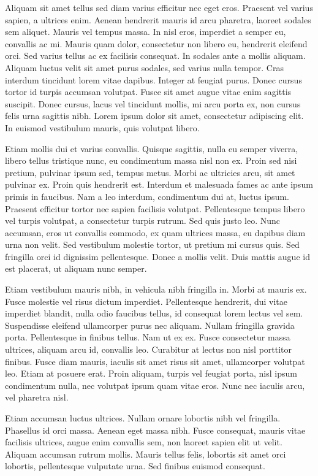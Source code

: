 Aliquam sit amet tellus sed diam varius efficitur nec eget eros. Praesent vel varius sapien, a ultrices enim. Aenean hendrerit mauris id arcu pharetra, laoreet sodales sem aliquet. Mauris vel tempus massa. In nisl eros, imperdiet a semper eu, convallis ac mi. Mauris quam dolor, consectetur non libero eu, hendrerit eleifend orci. Sed varius tellus ac ex facilisis consequat. In sodales ante a mollis aliquam. Aliquam luctus velit sit amet purus sodales, sed varius nulla tempor. Cras interdum tincidunt lorem vitae dapibus. Integer at feugiat purus. Donec cursus tortor id turpis accumsan volutpat. Fusce sit amet augue vitae enim sagittis suscipit. Donec cursus, lacus vel tincidunt mollis, mi arcu porta ex, non cursus felis urna sagittis nibh. Lorem ipsum dolor sit amet, consectetur adipiscing elit. In euismod vestibulum mauris, quis volutpat libero.

Etiam mollis dui et varius convallis. Quisque sagittis, nulla eu semper viverra, libero tellus tristique nunc, eu condimentum massa nisl non ex. Proin sed nisi pretium, pulvinar ipsum sed, tempus metus. Morbi ac ultricies arcu, sit amet pulvinar ex. Proin quis hendrerit est. Interdum et malesuada fames ac ante ipsum primis in faucibus. Nam a leo interdum, condimentum dui at, luctus ipsum. Praesent efficitur tortor nec sapien facilisis volutpat. Pellentesque tempus libero vel turpis volutpat, a consectetur turpis rutrum. Sed quis justo leo. Nunc accumsan, eros ut convallis commodo, ex quam ultrices massa, eu dapibus diam urna non velit. Sed vestibulum molestie tortor, ut pretium mi cursus quis. Sed fringilla orci id dignissim pellentesque. Donec a mollis velit. Duis mattis augue id est placerat, ut aliquam nunc semper.

Etiam vestibulum mauris nibh, in vehicula nibh fringilla in. Morbi at mauris ex. Fusce molestie vel risus dictum imperdiet. Pellentesque hendrerit, dui vitae imperdiet blandit, nulla odio faucibus tellus, id consequat lorem lectus vel sem. Suspendisse eleifend ullamcorper purus nec aliquam. Nullam fringilla gravida porta. Pellentesque in finibus tellus. Nam ut ex ex. Fusce consectetur massa ultrices, aliquam arcu id, convallis leo. Curabitur at lectus non nisl porttitor finibus. Fusce diam mauris, iaculis sit amet risus sit amet, ullamcorper volutpat leo. Etiam at posuere erat. Proin aliquam, turpis vel feugiat porta, nisl ipsum condimentum nulla, nec volutpat ipsum quam vitae eros. Nunc nec iaculis arcu, vel pharetra nisl.

Etiam accumsan luctus ultrices. Nullam ornare lobortis nibh vel fringilla. Phasellus id orci massa. Aenean eget massa nibh. Fusce consequat, mauris vitae facilisis ultrices, augue enim convallis sem, non laoreet sapien elit ut velit. Aliquam accumsan rutrum mollis. Mauris tellus felis, lobortis sit amet orci lobortis, pellentesque vulputate urna. Sed finibus euismod consequat.


